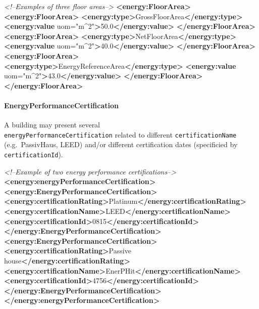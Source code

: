 \documentclass[a4paper,12pt]{article}
\newenvironment{Shaded}{}{}
\newcommand{\KeywordTok}[1]{\textcolor[rgb]{0.00,0.44,0.13}{\textbf{{#1}}}}
\newcommand{\StringTok}[1]{\textcolor[rgb]{0.25,0.44,0.63}{{#1}}}
\newcommand{\CommentTok}[1]{\textcolor[rgb]{0.38,0.63,0.69}{\textit{{#1}}}}
\newcommand{\OtherTok}[1]{\textcolor[rgb]{0.00,0.44,0.13}{{#1}}}
\newcommand{\NormalTok}[1]{{#1}}
\begin{document}
\begin{Shaded}
\begin{Highlighting}[]
\CommentTok{<!--Examples of three floor areas-->}
\KeywordTok{<energy:FloorArea>}
    \KeywordTok{<energy:FloorArea>}
        \KeywordTok{<energy:type>}\NormalTok{GrossFloorArea}\KeywordTok{</energy:type>}
        \KeywordTok{<energy:value}\OtherTok{ uom=}\StringTok{"m^2"}\KeywordTok{>}\NormalTok{50.0}\KeywordTok{</energy:value>}
    \KeywordTok{</energy:FloorArea>}
    \KeywordTok{<energy:FloorArea>}
        \KeywordTok{<energy:type>}\NormalTok{NetFloorArea}\KeywordTok{</energy:type>}
        \KeywordTok{<energy:value}\OtherTok{ uom=}\StringTok{"m^2"}\KeywordTok{>}\NormalTok{40.0}\KeywordTok{</energy:value>}
    \KeywordTok{</energy:FloorArea>}
    \KeywordTok{<energy:FloorArea>}
        \KeywordTok{<energy:type>}\NormalTok{EnergyReferenceArea}\KeywordTok{</energy:type>}
        \KeywordTok{<energy:value}\OtherTok{ uom=}\StringTok{"m^2"}\KeywordTok{>}\NormalTok{43.0}\KeywordTok{</energy:value>}
    \KeywordTok{</energy:FloorArea>}
\KeywordTok{</energy:FloorArea>}
\end{Highlighting}
\end{Shaded}

\paragraph{EnergyPerformanceCertification}\label{energyperformancecertification}

A building may present several\\
\texttt{energyPerformanceCertification} related to different
\texttt{certificationName} (e.g.~PassivHaus, LEED) and/or different
certification dates (specificied by \texttt{certificationId}).

\begin{Shaded}
\begin{Highlighting}[]
\CommentTok{<!--Example of two energy performance certifications-->}
\KeywordTok{<energy:energyPerformanceCertification>}
    \KeywordTok{<energy:EnergyPerformanceCertification>}
        \KeywordTok{<energy:certificationRating>}\NormalTok{Platinum}\KeywordTok{</energy:certificationRating>}
        \KeywordTok{<energy:certificationName>}\NormalTok{LEED}\KeywordTok{</energy:certificationName>}
        \KeywordTok{<energy:certificationId>}\NormalTok{0815}\KeywordTok{</energy:certificationId>}
    \KeywordTok{</energy:EnergyPerformanceCertification>}
    \KeywordTok{<energy:EnergyPerformanceCertification>}
        \KeywordTok{<energy:certificationRating>}\NormalTok{Passive house}\KeywordTok{</energy:certificationRating>}
        \KeywordTok{<energy:certificationName>}\NormalTok{EnerPHit}\KeywordTok{</energy:certificationName>}
        \KeywordTok{<energy:certificationId>}\NormalTok{4756}\KeywordTok{</energy:certificationId>}
    \KeywordTok{</energy:EnergyPerformanceCertification>}
\KeywordTok{</energy:energyPerformanceCertification>}
\end{Highlighting}
\end{Shaded}
\end{document}
